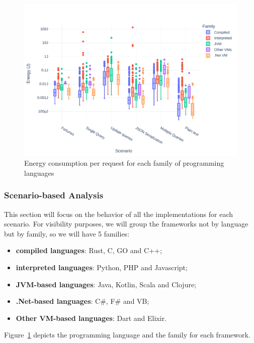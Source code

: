\begin{figure}[bht]
    \centering
    \includegraphics[width=.9\columnwidth ]{imgs/all_boxplot}
    \caption{Energy consumption per request for each family of programming languages}
    \label{fig:all_boxplot}
\end{figure}




\subsubsection{Scenario-based Analysis}
This section will focus on the behavior of all the implementations for each scenario.
For visibility purposes, we will group the frameworks not by language but by family, so we will have 5 families:
\begin{itemize}
    \item \textbf{compiled languages}: Rust, C, GO and C++;
    \item \textbf{interpreted languages}: Python, PHP and Javascript;
    \item \textbf{JVM-based languages}: Java, Kotlin, Scala and Clojure;
    \item \textbf{.Net-based languages}: C\#, F\# and VB;
    \item \textbf{Other VM-based languages}: Dart and Elixir.
\end{itemize}

Figure~\ref{fig:all_boxplot} depicts the programming language and the family for each framework.

